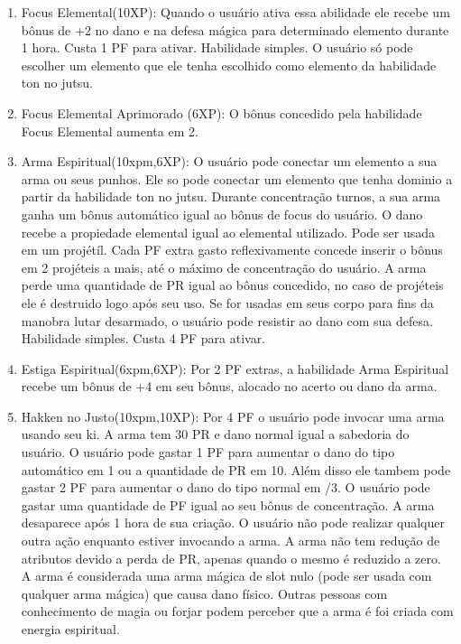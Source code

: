 \begin{enumerate}
 	\item Focus Elemental(10XP): Quando o usuário ativa essa abilidade ele recebe um bônus de +2 no dano e na defesa mágica para determinado elemento durante 1 hora. Custa 1 PF para ativar. Habilidade simples. O usuário só pode escolher um elemento que ele tenha escolhido como elemento da habilidade ton no jutsu.
 	
 	\item Focus Elemental Aprimorado (6XP): O bônus concedido pela habilidade Focus Elemental aumenta em 2.
		
	\item Arma Espiritual(10xpm,6XP): O usuário pode conectar um elemento a sua arma ou seus punhos. Ele so pode conectar um elemento que tenha dominio a partir da habilidade ton no jutsu. Durante concentração turnos, a sua arma ganha um bônus automático igual ao bônus de focus do usuário. O dano recebe a propiedade elemental igual ao elemental utilizado. Pode ser usada em um projétíl. Cada PF extra gasto reflexivamente concede inserir o bônus em 2 projéteis a mais, até o máximo de concentração do usuário. A arma perde uma quantidade de PR igual ao bônus concedido, no caso de projéteis ele é destruido logo após seu uso. Se for usadas em seus corpo para fins da manobra lutar desarmado, o usuário pode resistir ao dano com sua defesa. Habilidade simples. Custa 4 PF para ativar.

\item Estiga Espiritual(6xpm,6XP): Por 2 PF extras, a habilidade Arma Espiritual recebe um bônus de +4 em seu bônus, alocado no acerto ou dano da arma.

\item Hakken no Justo(10xpm,10XP): Por 4 PF o usuário pode invocar uma arma usando seu ki. A arma tem 30 PR e dano normal igual a sabedoria do usuário. O usuário pode gastar 1 PF para aumentar o dano do tipo automático em 1 ou a quantidade de PR em 10. Além disso ele tambem pode gastar 2 PF para aumentar o dano do tipo normal em /3. O usuário pode gastar uma quantidade de PF igual ao seu bônus de concentração. A arma desaparece após 1 hora de sua criação. O usuário não pode realizar qualquer outra ação enquanto estiver invocando a arma. A arma não tem redução de atributos devido a perda de PR, apenas quando o mesmo é reduzido a zero. A arma é considerada uma arma mágica de slot nulo (pode ser usada com qualquer arma mágica) que causa dano físico. Outras pessoas com conhecimento de magia ou forjar podem perceber que a arma é foi criada com energia espiritual.


\end{enumerate}
